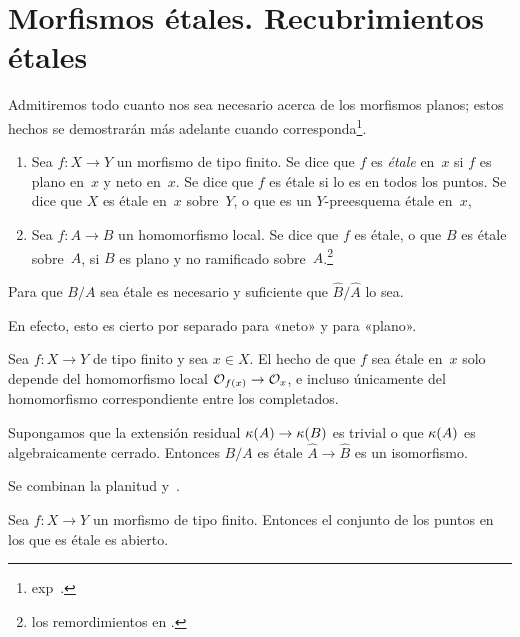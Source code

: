 \section{Morfismos étales. Recubrimientos étales}
\label{I.4}
Admitiremos todo cuanto nos sea necesario acerca de los morfismos planos; estos hechos se demostrarán más adelante cuando corresponda\footnote{\Cf exp\ptbl\ .}.

\begin{definition}
\label{I.4.1}
\begin{enumerate}
\item[a)] Sea $f\colon X\to Y$ un morfismo de tipo finito. Se dice que $f$ es \emph{étale}
%
en~$x$ si $f$ es plano en~$x$ y neto en~$x$. Se dice que $f$ es étale si lo es en todos los puntos. Se dice que $X$ es étale en~$x$ sobre~$Y$, o que es un $Y$-preesquema étale en~$x$, 
\item[b)] Sea $f\colon A\to B$ un homomorfismo local. Se dice que $f$ es étale, o que $B$ es étale sobre~$A$, si $B$ es plano y no ramificado sobre~$A$.\footnote{\Cf los remordimientos en .}
\end{enumerate}
\end{definition}

\begin{proposition}
\label{I.4.2}
Para que $B/A$ sea étale es necesario y suficiente que $\widehat{B}/\widehat{A}$ lo sea.
\end{proposition}

En efecto, esto es cierto por separado para «neto» y para «plano».

\begin{corollaire}
\label{I.4.3}
Sea $f\colon X\to Y$ de tipo finito y sea $x\in X$. El hecho de que $f$ sea étale en~$x$ solo depende del homomorfismo local $\cal{O}_{f(x)}\to\cal{O}_x$, e incluso únicamente del homomorfismo correspondiente entre los completados.
\end{corollaire}

\begin{corollaire}
\label{I.4.4}
Supongamos que la extensión residual $\kres(A)\to\kres(B)$ es trivial o que $\kres(A)$ es algebraicamente cerrado. Entonces $B/A$ es étale \sss $\widehat{A}\to\widehat{B}$ es un isomorfismo.
\end{corollaire}

Se combinan la planitud y~.
\begin{proposition}
\label{I.4.5}
Sea $f\colon X\to Y$ un morfismo de tipo finito. Entonces el conjunto de los puntos en los que es étale es abierto.
\end{proposition}

